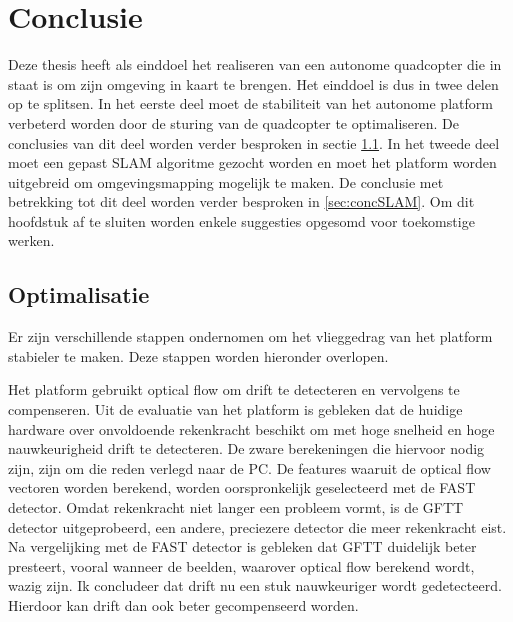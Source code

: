 \chapter{Conclusie}
Deze thesis heeft als einddoel het realiseren van een autonome quadcopter die in staat is om zijn omgeving in kaart te brengen. Het einddoel is dus in twee delen op te splitsen. In het eerste deel moet de stabiliteit van het autonome platform verbeterd worden door de sturing van de quadcopter te optimaliseren. De conclusies van dit deel worden verder besproken in sectie \ref{sec:concOpt}. In het tweede deel moet een gepast SLAM algoritme gezocht worden en moet het platform worden uitgebreid om omgevingsmapping mogelijk te maken. De conclusie met betrekking tot dit deel worden verder besproken in \ref{sec:concSLAM}. Om dit hoofdstuk af te sluiten worden enkele suggesties opgesomd voor toekomstige werken.

\section{Optimalisatie} \label{sec:concOpt}
Er zijn verschillende stappen ondernomen om het vlieggedrag van het platform stabieler te maken. Deze stappen worden hieronder overlopen.

\npar Het platform gebruikt optical flow om drift te detecteren en vervolgens te compenseren. Uit de evaluatie van het platform is gebleken dat de huidige hardware over onvoldoende rekenkracht beschikt om met hoge snelheid en hoge nauwkeurigheid drift te detecteren. De zware berekeningen die hiervoor nodig zijn, zijn om die reden verlegd naar de PC. De features waaruit de optical flow vectoren worden berekend, worden oorspronkelijk geselecteerd met de FAST detector. Omdat rekenkracht niet langer een probleem vormt, is de GFTT detector uitgeprobeerd, een andere, preciezere detector die meer rekenkracht eist. Na vergelijking met de FAST detector is gebleken dat GFTT duidelijk beter presteert, vooral wanneer de beelden, waarover optical flow berekend wordt, wazig zijn. Ik concludeer dat drift nu een stuk nauwkeuriger wordt gedetecteerd. Hierdoor kan drift dan ook beter gecompenseerd worden.

